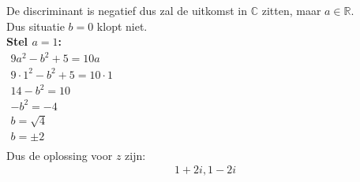 \documentclass[a4paper]{article}
\begin{document}
De discriminant is negatief dus zal de uitkomst in $\mathbb{C}$ zitten, maar $a \in \mathbb{R}$.    \\

Dus situatie $b = 0$ klopt niet.                                                                    \\

\textbf{Stel $a = 1$:}  \\

$\begin{array}{l}
    9a^2 - b^2 + 5        = 10a         \\
    9 \cdot 1^2 - b^2 + 5 = 10 \cdot 1  \\
    14 - b^2              = 10          \\
    - b^2                 = - 4         \\
    b                     = \sqrt{4}    \\
    b                     = \pm 2       \\
\end{array}$                            \\

Dus de oplossing voor $z$ zijn:         \\

\begin{eqnarray*}
    1 + 2i, 1 - 2i
\end{eqnarray*}
\end{document}
